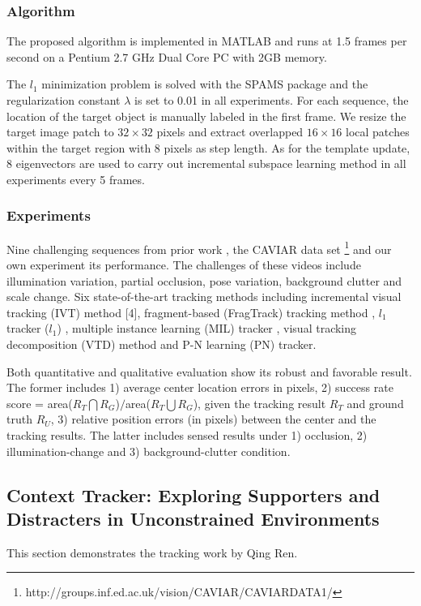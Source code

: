 \documentclass{acm_proc_article-sp}
\begin{document}
\subsubsection{Algorithm}
The proposed algorithm is implemented in MATLAB and runs at 1.5 frames per second on a Pentium 2.7 GHz Dual Core PC with 2GB memory.

The $l_1$ minimization problem is solved with the SPAMS package and the regularization constant $\lambda$ is set to 0.01 in all experiments. For each sequence, the location of the target object is manually labeled in the first frame. We resize the target image patch to $32\times 32$ pixels and extract overlapped $16\times16$ local patches within the target region with 8 pixels as step length. As for the template update, 8 eigenvectors are used to carry out incremental subspace learning method in all experiments every 5 frames.

\subsubsection{Experiments}
\label{sec:asla_section}
Nine challenging sequences from prior work \cite{shi1,shi2,shi3,shi4,shi5}, the CAVIAR data set \footnote{http://groups.inf.ed.ac.uk/vision/CAVIAR/CAVIARDATA1/} and our own experiment its performance. The challenges of these videos include illumination variation, partial occlusion, pose variation, background clutter and scale change. Six state-of-the-art tracking methods including incremental visual tracking (IVT) method [4], fragment-based (FragTrack) tracking method \cite{shi1}, $l_1$ tracker ($l_1$) \cite{shi6}, multiple instance learning (MIL) tracker \cite{shi2}, visual tracking decomposition (VTD) method \cite{shi3} and P-N learning (PN) tracker. \cite{shi7}

Both quantitative and qualitative evaluation show its robust and favorable result. The former includes 1) average center location errors in pixels, 2)
success rate score = area($R_T \bigcap R_G$)$/$area($R_T \bigcup R_G$), given the tracking result $R_T$ and ground truth $R_U$, 3) relative position errors (in pixels) between the center and the tracking results. The latter includes sensed results under 1) occlusion, 2) illumination-change and 3) background-clutter condition.


\subsection{Context Tracker: Exploring Supporters and Distracters in Unconstrained Environments}
This section demonstrates the tracking work by Qing Ren.
\end{document}
